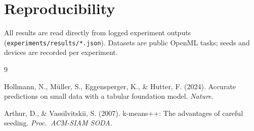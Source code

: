 \documentclass[11pt,a4paper]{article}
\begin{document}
\section*{Reproducibility}

All results are read directly from logged experiment outputs
(\texttt{experiments/results/*.json}). Datasets are public OpenML tasks; seeds
and devices are recorded per experiment.

\begin{thebibliography}{9}

Hollmann, N., Müller, S., Eggensperger, K., \& Hutter, F. (2024).
Accurate predictions on small data with a tabular foundation model.
\textit{Nature}.

Arthur, D., \& Vassilvitskii, S. (2007).
k-means++: The advantages of careful seeding.
\textit{Proc.\ ACM-SIAM SODA}.

\end{thebibliography}
\end{document}
